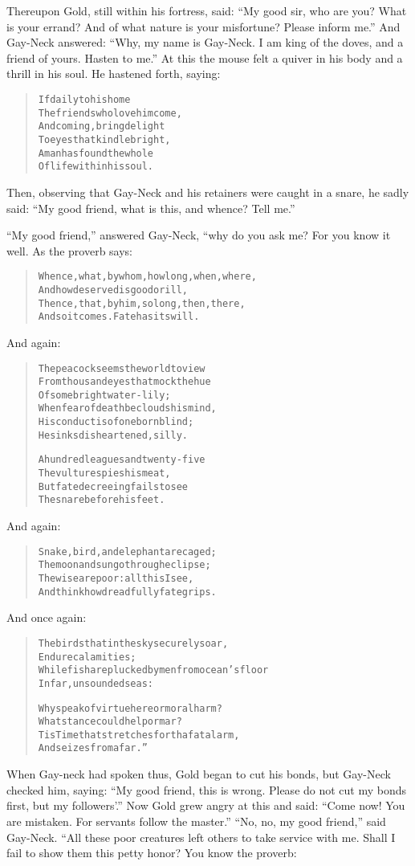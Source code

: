 \documentclass[article, twoside, 14pt]{memoir}
\renewenvironment{verbatim}{%
\begin{quote}%
\vskip -10pt%
\begin{alltt}\normalfont\large}{\end{alltt}%
\end{quote}%
\vskip -10pt
} %
\begin{document}
Thereupon Gold, still within his fortress, said:
``My good sir, who are you? What is your errand? And of what nature is your misfortune? Please inform me.''
And Gay-Neck answered:
``Why, my name is Gay-Neck. I am king of the doves, and a friend of yours. Hasten to me.''
At this the mouse felt a quiver in his body and a thrill in his
soul. He hastened forth, saying:

\begin{verbatim}
If daily to his home
The friends who love him come,
And coming, bring delight
To eyes that kindle bright,
A man has found the whole
Of life within his soul.
\end{verbatim}
Then, observing that Gay-Neck and his retainers were caught
in a snare, he sadly said:
``My good friend, what is this, and whence? Tell me.''

``My good friend,'' answered Gay-Neck, “why do you ask me? For you
know it well. As the proverb says:

\begin{verbatim}
Whence, what, by whom, how long, when, where,
    And how deserved is good or ill,
Thence, that, by him, so long, then, there,
    And so it comes. Fate has its will.
\end{verbatim}
And again:

\begin{verbatim}
The peacock seems the world to view
From thousand eyes that mock the hue
    Of some bright water-lily;
When fear of death beclouds his mind,
His conduct is of one born blind;
    He sinks disheartened, silly.

A hundred leagues and twenty-five
    The vulture spies his meat,
But{\textemdash}fate decreeing{\textemdash}fails to see
    The snare before his feet.
\end{verbatim}
And again:

\begin{verbatim}
Snake, bird, and elephant are caged;
    The moon and sun go through eclipse;
The wise are poor: all this I see,
    And think how dreadfully fate grips.
\end{verbatim}
And once again:

\begin{verbatim}
The birds that in the sky securely soar,
    Endure calamities;
While fish are plucked by men from ocean's floor
    In far, unsounded seas:

Why speak of virtue here or moral harm?
What stance could help or mar?
Tis Time that stretches forth a fatal arm,
And seizes from afar.”
\end{verbatim}
When Gay-neck had spoken thus, Gold began to cut his bonds, but
Gay-Neck checked him, saying:
``My good friend, this is wrong. Please do not cut my bonds first, but my followers'.''
Now Gold grew angry at this and said:
``Come now! You are mistaken. For servants follow the master.''
``No, no, my good friend,'' said Gay-Neck. “All these poor
creatures left others to take service with me. Shall I fail to show
them this petty honor? You know the proverb:
\end{document}
